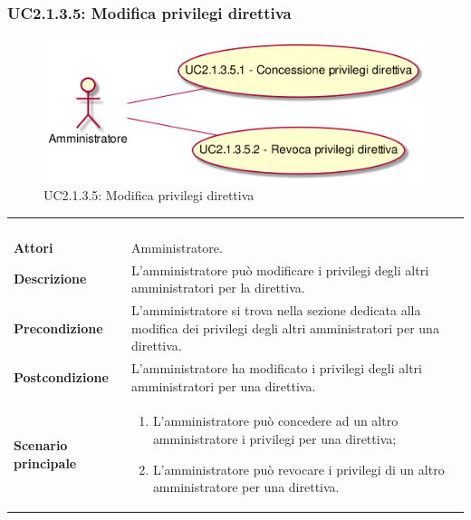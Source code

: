 \subsubsection{UC2.1.3.5: Modifica privilegi direttiva}
\label{UC2.1.3.5}
\begin{figure}[h]
\centering
\includegraphics[width=\textwidth,height=\textheight,keepaspectratio]{images/UseCaseUC2135.png}
\caption{UC2.1.3.5: Modifica privilegi direttiva}
\end{figure}
\begin{longtable}{l|p{10cm}}
\rowcolor[gray]{0.8} \multicolumn{2}{c}{} \\
\rowcolor[gray]{0.8} \multicolumn{2}{c}{\textbf{UC2.1.3.5 - Modifica privilegi direttiva}} \\
\rowcolor[gray]{0.8} \multicolumn{2}{c}{} \\
\hline
&\\
\textbf{Attori} & Amministratore.\\[7pt]
\textbf{Descrizione} & L'amministratore può modificare i privilegi degli altri amministratori per la direttiva.\\[7pt]
\textbf{Precondizione} & L'amministratore si trova nella sezione dedicata alla modifica dei privilegi degli altri amministratori per una direttiva.\\[7pt]
\textbf{Postcondizione} & L'amministratore ha modificato i privilegi degli altri amministratori per una direttiva.\\[7pt]
\textbf{Scenario principale} &\begin{enumerate}
\item  L'amministratore può concedere ad un altro amministratore i privilegi per una direttiva;
\item  L'amministratore può revocare i privilegi di un altro amministratore per una direttiva.
\end{enumerate}
\\[7pt]\hline
\end{longtable}

